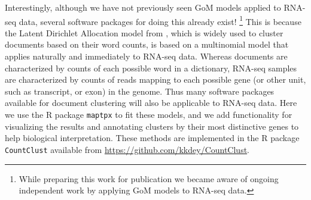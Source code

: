 Interestingly, although we have not previously seen GoM models applied to RNA-seq data, several software packages
for doing this already exist! \footnote{While preparing this work for publication we became aware of ongoing independent work
by \cite{duVerle2016} applying GoM models to RNA-seq data.}
 This is because the 
Latent Dirichlet Allocation model from \cite{Blei2003}, which is widely used to cluster documents based on their word counts, is based on a multinomial model that applies naturally and immediately to RNA-seq data. 
Whereas documents are characterized by counts of each possible word in a dictionary, RNA-seq samples
are characterized by counts of reads mapping to each possible gene (or other unit, such as transcript, or exon) in the genome. 
Thus many software packages available for document clustering will also be applicable to RNA-seq data.
Here we use the R package {\tt maptpx} \cite{Taddy2012} to fit these models, and we add functionality for visualizing the results and annotating
clusters by their most distinctive genes to help biological interpretation. These methods are implemented in the R package {\tt CountClust} available
from \url{https://github.com/kkdey/CountClust}.  










